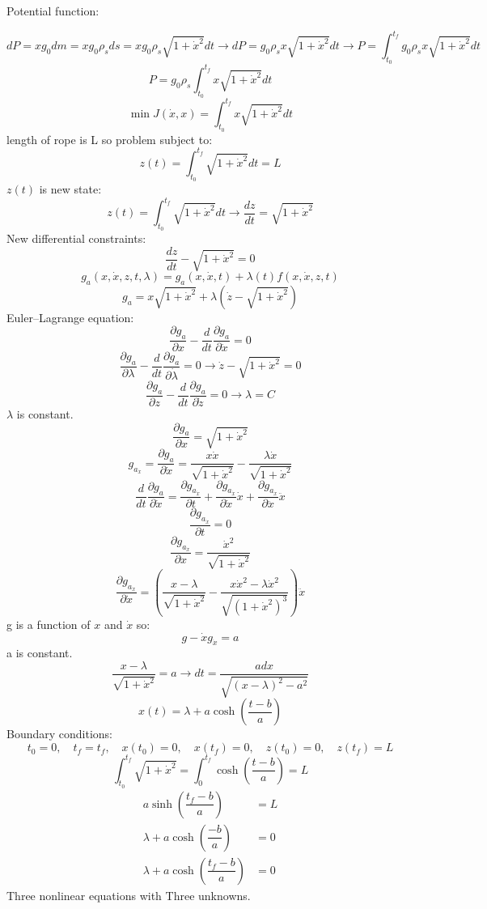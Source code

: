 Potential function:


$$dP = xg_0dm = xg_0\rho_s ds = xg_0\rho_s\sqrt{1+\dot{x}^2}dt
\to dP = g_0\rho_sx\sqrt{1+\dot{x}^2} dt\to P = \int_{t_0}^{t_f} g_0\rho_sx\sqrt{1+\dot{x}^2}dt
$$
$$P = g_0\rho_s\int_{t_0}^{t_f} x\sqrt{1+\dot{x}^2}dt$$
$$\min J(\dot{x}, x) = \int_{t_0}^{t_f} x\sqrt{1+\dot{x}^2}dt$$
length of rope is L so problem subject to:
$$z(t) = \int_{t_0}^{t_f} \sqrt{1+\dot{x}^2}dt = L$$ 
$z(t)$ is new state:
$$z(t) = \int_{t_0}^{t_f} \sqrt{1+\dot{x}^2}dt\to \dfrac{dz}{dt} =\sqrt{1+\dot{x}^2} $$
New differential constraints:
$$\dfrac{dz}{dt} - \sqrt{1+\dot{x}^2}  = 0$$
$$g_a(x, \dot x, z, t, \lambda) = g_a(x, \dot x, t) + \lambda(t)f(x, \dot x, z, t) $$
$$g_a = x\sqrt{1+\dot{x}^2} + \lambda (\dot z - \sqrt{1+\dot{x}^2})$$
Euler–Lagrange equation:
$$\dfrac{\partial g_a}{\partial x} - \dfrac{d}{dt}\dfrac{\partial g_a}{\partial \dot x} = 0$$
$$\dfrac{\partial g_a}{\partial \lambda} - \dfrac{d}{dt}\dfrac{\partial g_a}{\partial \dot \lambda} = 0 \to 
\dot z -  \sqrt{1+\dot{x}^2} = 0
$$
$$\dfrac{\partial g_a}{\partial z} - \dfrac{d}{dt}\dfrac{\partial g_a}{\partial \dot z} = 0 \to \lambda = C$$
$\lambda$ is constant.
$$\dfrac{\partial g_a}{\partial x} =  \sqrt{1+\dot{x}^2}$$
$$g_{a_{\dot{x}}} = \dfrac{\partial g_a}{\partial \dot x} = \dfrac{x\dot x}{\sqrt{1+\dot x^2}}  - \dfrac{\lambda \dot x}{\sqrt{1+\dot x^2}} $$
$$\dfrac{d}{dt}\dfrac{\partial g_a}{\partial \dot x} = \dfrac{\partial g_{a_{\dot{x}}}}{\partial  t}+
\dfrac{\partial g_{a_{\dot{x}}}}{\partial \dot x}\dot x+
\dfrac{\partial g_{a_{\dot{x}}}}{\partial \ddot x} \ddot x
$$
$$\dfrac{\partial g_{a_{\dot{x}}}}{\partial t} = 0$$
$$\dfrac{\partial g_{a_{\dot{x}}}}{\partial x} =  \dfrac{ \dot x^2}{\sqrt{1+\dot x^2}}$$
$$\dfrac{\partial g_{a_{\dot{x}}}}{\partial \dot x} = (\dfrac{x - \lambda }{\sqrt{1+\dot x^2}}
- \dfrac{x\dot x^2 - \lambda \dot x^2}{\sqrt{(1+\dot x^2)^3}})\ddot x
$$
g is a function of $x$ and $\dot x$ so:
$$g - \dot x g_{\dot x} = a$$
a is constant.
$$\dfrac{x-\lambda}{\sqrt{1+\dot x^2}} = a \to dt = \dfrac{adx}{\sqrt{(x-\lambda)^2-a^2}}$$
$$x(t) = \lambda + a\cosh(\dfrac{t-b}{a})$$
Boundary conditions:
$$t_0 = 0,\quad t_f =t_f,\quad x(t_0) = 0,\quad x(t_f) = 0,\quad z(t_0) = 0,\quad z(t_f) = L$$
$$\int_{t_0}^{t_f} \sqrt{1 + \dot x^2} =\int_{0}^{t_f}  \cosh(\dfrac{t-b}{a}) = L$$
\begin{align}
a \sinh(\dfrac{t_f-b}{a}) &= L\\
\lambda + a\cosh(\dfrac{-b}{a} )  & = 0\\
\lambda + a\cosh(\dfrac{t_f- b}{a} )  & = 0
\end{align}
Three nonlinear equations with Three unknowns.


